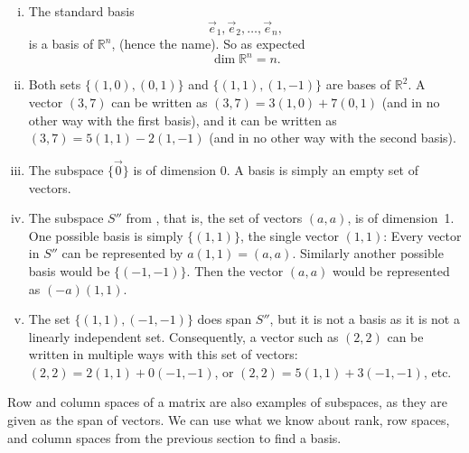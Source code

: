 \begin{example}
\begin{enumerate}[(i)]
\item
The standard basis
\begin{equation*}
\vec{e}_1, \vec{e}_2, \ldots, \vec{e}_n ,
\end{equation*}
is a basis of ${\mathbb R}^n$, (hence the name).
So as expected
\begin{equation*}
\dim {\mathbb R}^n = n .
\end{equation*}
\item
Both sets $\bigl\{ (1,0) , (0,1) \bigr\}$ and
$\bigl\{ (1,1), (1,-1) \bigr\}$ are
bases of ${\mathbb{R}}^2$.  A vector $(3,7)$ can
be written as
$(3,7)=3 (1,0) + 7 (0,1)$
(and in no other way with the first basis),
and it can be written as
$(3,7)=5 (1,1) - 2(1,-1)$
(and in no other way with the second basis).
\item
The subspace $\{ \vec{0} \}$ is of dimension $0$.
A basis is simply an empty set of vectors.
\item
The subspace $S''$ from , that is, the set of
vectors $(a,a)$, is of dimension~1.  One possible basis is simply
$\bigl\{ (1,1) \bigr\}$, the single
vector $(1,1)$: Every vector in $S''$ can be represented by $a (1,1) =
(a,a)$.  Similarly another possible basis would be
$\bigl\{ (-1,-1) \bigr\}$.  Then
the vector $(a,a)$ would be represented as $(-a) (1,1)$.
\item
The set $\bigl\{ (1,1) , (-1,-1) \bigr\}$ does
span $S''$, but it is not a basis as it is not a linearly independent set.
Consequently, a vector such as $(2,2)$ can be written in multiple
ways with this set of vectors:
$(2,2) = 2(1,1) + 0 (-1,-1)$,
or
$(2,2) = 5(1,1) + 3 (-1,-1)$, etc.
\end{enumerate}
\end{example}

Row and column spaces of a matrix are also examples of
subspaces,
as they are given as the span of vectors.
We can use
what we know about rank, row spaces, and column spaces
from the previous section to find a basis.

